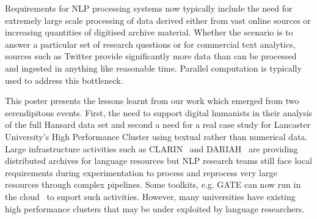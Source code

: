 

Requirements for NLP processing systems now typically include the need for extremely large scale processing of data derived either from vast online sources or increasing quantities of digitised archive material. 
Whether the scenario is to answer a particular set of research questions or for commercial text analytics, sources such as Twitter provide significantly more data than can be processed and ingested in anything like reasonable time. Parallel computation is typically used to address this bottleneck. 


This poster presents the lessons learnt from our work which emerged from two serendipitous events. First, the need to support digital humanists in their analysis of the full Hansard data set and second a need for a real case study for Lancaster University's High Performance Cluster using textual rather than numerical data. Large infrastructure activities such as CLARIN~\cite{varadi2008clarin} and DARIAH~\cite{constantopoulos2008preparing} are providing distributed archives for language resources but NLP research teams still face local requirements during experimentation to process and reprocess very large resources through complex pipelines. Some toolkits, e.g. GATE can now run in the cloud~\cite{tablan2013gatecloud} to suport such activities. However, many universities have existing high performance clusters that may be under exploited by language researchers. 

